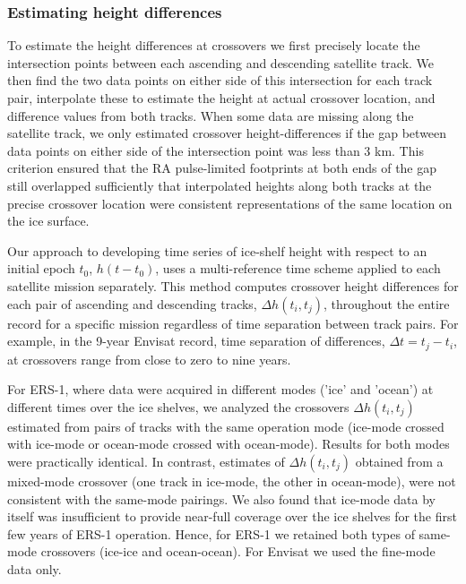 \subsubsection{Estimating height differences}

To estimate the height differences at crossovers we first precisely locate the intersection points between each ascending and descending satellite track. We then find the two data points on either side of this intersection for each track pair, interpolate these to estimate the height at actual crossover location, and difference values from both tracks. When some data are missing along the satellite track, we only estimated crossover height-differences if the gap between data points on either side of the intersection point was less than 3 km. This criterion ensured that the RA pulse-limited footprints at both ends of the gap still overlapped sufficiently that interpolated heights along both tracks at the precise crossover location were consistent representations of the same location on the ice surface.

Our approach to developing time series of ice-shelf height with respect to an initial epoch $t_0$, $h(t-t_0)$, uses a multi-reference time scheme \parencite{Khvorostovsky2012, Li2006} applied to each satellite mission separately. This method computes crossover height differences for each pair of ascending and descending tracks, $\Delta h(t_i,t_j)$, throughout the entire record for a specific mission regardless of time separation between track pairs. For example, in the 9-year Envisat record, time separation of differences, $\Delta t=t_j-t_i$, at crossovers range from close to zero to nine years. 

For ERS-1, where data were acquired in different modes ('ice' and 'ocean') at different times over the ice shelves, we analyzed the crossovers $\Delta h(t_i,t_j)$ estimated from pairs of tracks with the same operation mode (ice-mode crossed with ice-mode or ocean-mode crossed with ocean-mode). Results for both modes were practically identical. In contrast, estimates of $\Delta h(t_i,t_j)$ obtained from a mixed-mode crossover (one track in ice-mode, the other in ocean-mode), were not consistent with the same-mode pairings. We also found that ice-mode data by itself was insufficient to provide near-full coverage over the ice shelves for the first few years of ERS-1 operation. Hence, for ERS-1 we retained both types of same-mode crossovers (ice-ice and ocean-ocean). For Envisat we used the fine-mode data only. 

